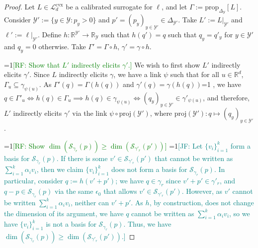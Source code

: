 \documentclass[11pt]{article} %
\newcommand{\Comments}{1}
\newcommand{\mynote}[2]{\ifnum\Comments=1\textcolor{#1}{#2}\fi}
\newcommand{\mytodo}[2]{\ifnum\Comments=1%
	\todo[linecolor=#1!80!black,backgroundcolor=#1,bordercolor=#1!80!black]{#2}\fi}
\newcommand{\raf}[1]{\mynote{green}{[RF: #1]}}
\newcommand{\jessie}[1]{\mynote{teal}{[JF: #1]}}
\newcommand{\jessiet}[1]{\mytodo{teal!20!white}{JF: #1}}
\newcommand{\reals}{\mathbb{R}}
\newcommand{\simplex}{\Delta_\Y}
\newcommand{\prop}[2][\mathcal{P}]{\mathrm{prop}_{#1}[#2]}
\newcommand{\proj}{\mathrm{proj}}
\newcommand{\Lcvx}{\mathcal{L}^{\mathrm{cvx}}}
\newcommand{\Sc}{\mathcal{S}}  %
\newcommand{\Y}{\mathcal{Y}}
\begin{document}
\hariresult*
\begin{proof}
  Let $L \in \Lcvx_d$ be a calibrated surrogate for $\ell$, and let $\Gamma := \prop[\simplex]{L}$.
  Consider $\Y' := \{y\in\Y : p_y > 0\}$ and $p' = (p_y)_{y\in\Y'} \in \Delta_{\Y'}$.
  Take $L' := L|_{\Y'}$ and $\ell' := \ell|_{\Y'}$.
  Define $h:\reals^{\Y'} \to \reals_\Y$ such that $h(q') = q$ such that $q_y = q'_y$ for $y\in\Y'$ and $q_y = 0$ otherwise.
  Take $\Gamma' = \Gamma \circ h$, $\gamma' = \gamma \circ h$.
  
  \raf{Show that $L'$ indirectly elicits $\gamma'$.}
  We wish to first  show $L'$ indirectly elicits $\gamma'$.
  Since $L$ indirectly elicits $\gamma$, we have a link $\psi$ such that for all $u \in \reals^d$, $\Gamma_u \subseteq \gamma_{\psi(u)}$.
  As $\Gamma'(q) = \Gamma(h(q))$ and $\gamma'(q) = \gamma(h(q))$\jessiet{Hand waving}, we have $q \in \Gamma'_u \iff h(q) \in \Gamma_u \implies h(q) \in \gamma_{\psi(u)} \iff (q_y)_{y \in \Y'} \in \gamma'_{\psi(u)}$, and therefore, $L'$ indirectly elicits $\gamma'$ via the link $\psi \circ \proj(\Y')$, where $\proj(\Y') : q \mapsto (q_y)_{y \in \Y'}$. 

  \raf{Show $\dim(\Sc_{\gamma_r}(p)) \geq \dim(\Sc_{\gamma'_r}(p'))$}
\jessie{  Let $\{v_i\}_{i=1}^k$ form a basis for $\Sc_{\gamma_r}(p)$.
  If there is some $v' \in \Sc_{\gamma'_r}(p')$ that cannot be written as $\sum_{i=1}^k \alpha_i v_i$, then we claim $\{v_i\}_{i=1}^k$ does not form a basis for $\Sc_{\gamma_r}(p)$.
  In particular, consider $q := h(v' + p')$; we have $q \in \gamma_r$ since $v' + p' \in \gamma'_r$, and $q - p \in \Sc_{\gamma_r}(p)$ via the same $\epsilon_0$ that allows $v' \in \Sc_{\gamma'_r}(p')$.
  However, as $v'$ cannot be written $\sum_{i=1}^k \alpha_i v_i$, neither can $v' + p'$.
  As $h$, by construction, does not change the dimension of its argument, we have $q$ cannot be written as $\sum_{i=1}^k \alpha_i v_i$, so we have $\{v_i\}_{i=1}^k$ is not a basis for $\Sc_{\gamma_r}(p)$.
  Thus, we have $\dim(\Sc_{\gamma_r}(p)) \geq \dim(\Sc_{\gamma'_r}(p'))$.}
  

\end{proof}
\end{document}
